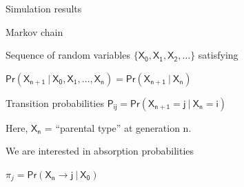 \documentclass[aspectratio=169,12pt,t]{beamer}
\begin{document}
\begin{frame}[c]{Simulation results}

\note{
}


\note{
}

\end{frame}


\begin{frame}[c]{Markov chain}

\bbi
\item Sequence of random variables $\mathsf{\{X_0, X_1, X_2, \dots\}}$
  satisfying

\vspace{2mm}

\centerline{\hilit $\mathsf{Pr(X_{n+1} \ | \ X_0,
X_1, \dots, X_n) = Pr(X_{n+1} \ | \ X_n)}$}

\item Transition probabilities {\hilit $\mathsf{P_{ij} =
  Pr(X_{n+1} = j \ | \ X_n = i)}$}

\item Here, $\mathsf{X_n}$ = ``parental type'' at generation n.

\item We are interested in {\vhilit absorption probabilities}

\vspace{2mm}

\centerline{\hilit $\pi_j = \mathsf{Pr(X_n \rightarrow j \ | \ X_0)}$}
\ei


\note{
}

\end{frame}
\end{document}
